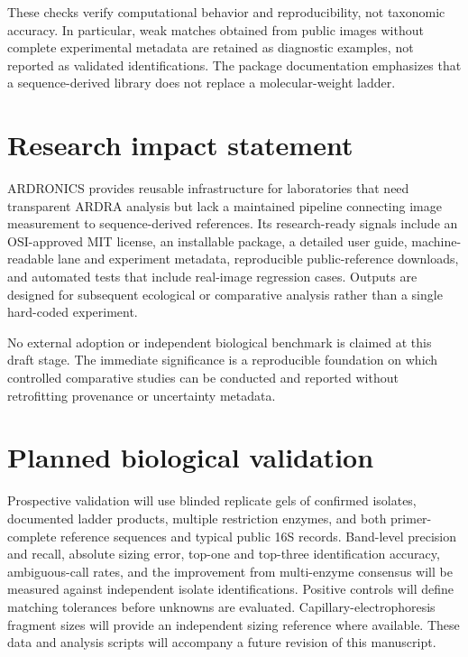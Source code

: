 \documentclass[
  11pt]{article}
\begin{document}
These checks verify computational behavior and reproducibility, not
taxonomic accuracy. In particular, weak matches obtained from public
images without complete experimental metadata are retained as diagnostic
examples, not reported as validated identifications. The package
documentation emphasizes that a sequence-derived library does not
replace a molecular-weight ladder.

\section{Research impact statement}\label{research-impact-statement}

ARDRONICS provides reusable infrastructure for laboratories that need
transparent ARDRA analysis but lack a maintained pipeline connecting
image measurement to sequence-derived references. Its research-ready
signals include an OSI-approved MIT license, an installable package, a
detailed user guide, machine-readable lane and experiment metadata,
reproducible public-reference downloads, and automated tests that
include real-image regression cases. Outputs are designed for subsequent
ecological or comparative analysis rather than a single hard-coded
experiment.

No external adoption or independent biological benchmark is claimed at
this draft stage. The immediate significance is a reproducible
foundation on which controlled comparative studies can be conducted and
reported without retrofitting provenance or uncertainty metadata.

\section{Planned biological
validation}\label{planned-biological-validation}

Prospective validation will use blinded replicate gels of confirmed
isolates, documented ladder products, multiple restriction enzymes, and
both primer-complete reference sequences and typical public 16S records.
Band-level precision and recall, absolute sizing error, top-one and
top-three identification accuracy, ambiguous-call rates, and the
improvement from multi-enzyme consensus will be measured against
independent isolate identifications. Positive controls will define
matching tolerances before unknowns are evaluated.
Capillary-electrophoresis fragment sizes will provide an independent
sizing reference where available. These data and analysis scripts will
accompany a future revision of this manuscript.
\end{document}
